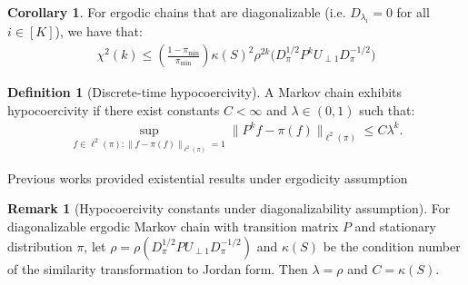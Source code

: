 \documentclass[preprint]{imsart}
\theoremstyle{plain}
\theoremstyle{definition}
\newtheorem{definition}[theorem]{Definition}
\newtheorem{remark}{Remark}
\newtheorem{corollary}{Corollary}
\begin{document}
\begin{corollary}
\label{cor:diag_chi_sq}
For ergodic chains that are diagonalizable (i.e.  $D_{\lambda_i} = 0$ for all $i\in [K]$), we have that:
\begin{align}
    \label{eq:chi_diag_case}
    \chi^{2}(k) \leq \left(\frac{1-\pi_{\min}}{\pi_{\min}}\right) \kappa(S)^2 \rho^{2k}\big(D_{\pi}^{1/2} P^k U_{\perp 1} D_{\pi}^{-1/2}\big)
\end{align}
\end{corollary}
\begin{definition}[Discrete-time hypocoercivity]
    A Markov chain exhibits hypocoercivity if there exist constants $C<\infty$ and $\lambda \in (0,1)$ such that:
    \begin{align}
        \label{eq:hyp_constants}
        \sup_{f \in \ell^{2}(\pi):\|f-\pi(f)\|_{\ell^{2}(\pi)}=1} \|P^{k}f-\pi(f)\|_{\ell^{2}(\pi)} \leq C \lambda^{k}.
    \end{align}
\end{definition}
Previous works \cite{baxendale2005renewal,villani2006hypocoercivity} provided existential results under ergodicity assumption

\begin{remark}[Hypocoercivity constants under diagonalizability assumption]
\label{rmk:hypocoercivity-constants} 
For diagonalizable ergodic Markov chain with transition matrix $P$ and stationary distribution $\pi$, let $\rho = \rho(D_{\pi}^{1/2} P U_{\perp 1} D_{\pi}^{-1/2})$ and $\kappa(S)$ be the condition number of the similarity transformation to Jordan form. Then $\lambda =\rho$ and $C=\kappa(S)$.
\end{remark}
\end{document}
